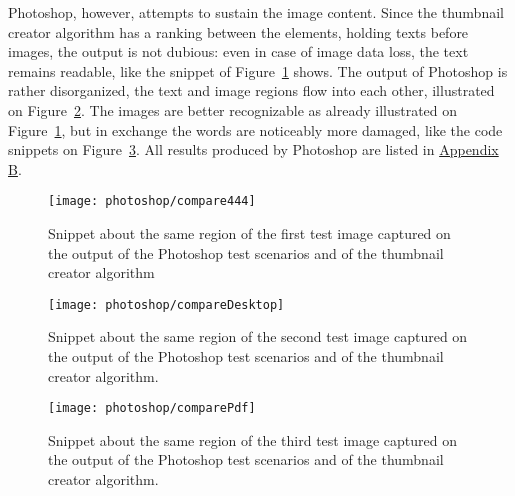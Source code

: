 \documentclass[draft,final]{vutinfth} %
\begin{document}
	Photoshop, however, attempts to sustain the image content.
	Since the thumbnail creator algorithm has a ranking between the elements, holding texts before images, the output is not dubious: even in case of image data loss, the text remains readable, like the snippet of Figure~\ref{fig:comp444} shows.
	The output of Photoshop is rather disorganized, the text and image regions flow into each other, illustrated on Figure~\ref{fig:compDesktop}.
	The images are better recognizable as already illustrated on Figure~\ref{fig:comp444}, but in exchange the words are noticeably more damaged, like the code snippets on Figure~\ref{fig:comppdf}. 
	All results produced by Photoshop are listed in \hyperref[AppB]{Appendix B}. 
	
	\begin{figure}[H]
		\centering		
		\texttt{[image: photoshop/compare444]}
		\caption{Snippet about the same region of the first test image captured on the output of the Photoshop test scenarios and of the thumbnail creator algorithm }
		\label{fig:comp444}
	\end{figure}
	\begin{figure}[H]
		\centering		
		\texttt{[image: photoshop/compareDesktop]}
		\caption{Snippet about the same region of the second test image captured on the output of the Photoshop test scenarios and of the thumbnail creator algorithm.}
		\label{fig:compDesktop}
	\end{figure}
	\begin{figure}[H]
		\centering		
		\texttt{[image: photoshop/comparePdf]}
		\caption{Snippet about the same region of the third test image captured on the output of the Photoshop test scenarios and of the thumbnail creator algorithm.}
		\label{fig:comppdf}
	\end{figure}
	
\end{document}
